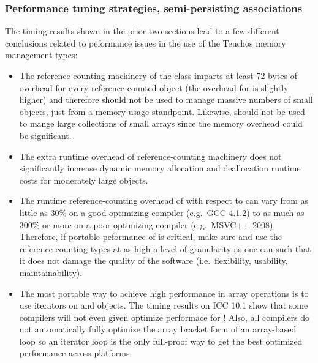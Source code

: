 \documentclass[pdf,ps2pdf,11pt]{SANDreport}
\begin{document}
%
{}\subsubsection{Performance tuning strategies, semi-persisting associations}
\label{sec:perf-tuning-strategies}
%

The timing results shown in the prior two sections lead to a few
different conclusions related to peformance issues in the use of the
Teuchos memory management types:

\begin{itemize}

{}\item The reference-counting machinery of the {} class
imparts at least 72 bytes of overhead for every reference-counted
object (the overhead for {} is slightly higher) and
therefore {} should not be used to manage massive numbers
of small objects, just from a memory usage standpoint.  Likewise,
{} should not be used to mange large collections of
small arrays since the memory overhead could be significant.

{}\item The extra runtime overhead of reference-counting machinery
does not significantly increase dynamic memory allocation and
deallocation runtime costs for moderately large objects.

{}\item The runtime reference-counting overhead of {} with
respect to {} can vary from as little as 30\%
on a good optimizing compiler (e.g.\ GCC 4.1.2) to as much as 300\% or
more on a poor optimizing compiler (e.g.\ MSVC++ 2008).  Therefore, if
portable peformance of is critical, make sure and use the
reference-counting types at as high a level of granularity as one can
such that it does not damage the quality of the software (i.e.\
flexibility, usability, maintainability).

{}\item The most portable way to achieve high performance in array
operations is to use iterators on {}\ttt{ArrayRCP} and
{} objects.  The timing results on ICC 10.1 show that
some compilers will not even given optimize performace for
{}!  Also, all compilers do not
automatically fully optimize the array bracket form of an array-based
loop so an iterator loop is the only full-proof way to get the best
optimized performance across platforms.

\end{itemize}
\end{document}
